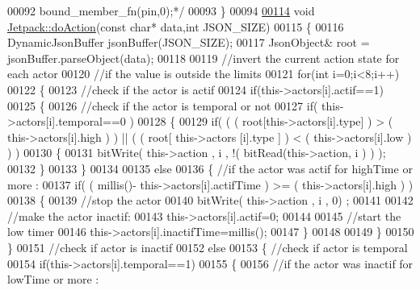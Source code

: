 \begin{DoxyCode}
00092 \textcolor{comment}{    bound\_member\_fn(pin,0);*/}
00093 \}
00094 
\hyperlink{class_jetpack_a86d2e83436ef4b85f4c3a6e85ac785b0}{00114} \textcolor{keywordtype}{void} \hyperlink{class_jetpack_a86d2e83436ef4b85f4c3a6e85ac785b0}{Jetpack::doAction}(\textcolor{keyword}{const} \textcolor{keywordtype}{char}* data,\textcolor{keywordtype}{int} JSON\_SIZE)
00115 \{
00116     DynamicJsonBuffer jsonBuffer(JSON\_SIZE);
00117     JsonObject& root = jsonBuffer.parseObject(data);
00118     
00119     \textcolor{comment}{//invert the current action state for each actor}
00120     \textcolor{comment}{//if the value is outside the limits}
00121     \textcolor{keywordflow}{for}(\textcolor{keywordtype}{int} i=0;i<8;i++)
00122     \{
00123         \textcolor{comment}{//check if the actor is actif }
00124         \textcolor{keywordflow}{if}(this->actors[i].actif==1)
00125         \{   
00126             \textcolor{comment}{//check if the actor is temporal or not}
00127             \textcolor{keywordflow}{if}( this->actors[i].temporal==0 ) 
00128             \{
00129                 \textcolor{keywordflow}{if}( ( ( root[this->actors[i].type] ) > ( this->actors[i].high ) ) || ( ( root[ this->actors
      [i].type ] ) < ( this->actors[i].low ) ) )   
00130                 \{   
00131                     bitWrite( this->action , i , !( bitRead(this->action, i ) ) );  
00132                 \}
00133             \}
00134 
00135             \textcolor{keywordflow}{else}
00136             \{   \textcolor{comment}{//if the actor was actif for highTime or more :}
00137                 \textcolor{keywordflow}{if}( ( millis()- this->actors[i].actifTime  ) >= ( this->actors[i].high  ) )
00138                 \{
00139                     \textcolor{comment}{//stop the actor}
00140                     bitWrite( this->action , i , 0) ;
00141 
00142                     \textcolor{comment}{//make the actor inactif:}
00143                     this->actors[i].actif=0;
00144 
00145                     \textcolor{comment}{//start the low timer}
00146                     this->actors[i].inactifTime=millis();               
00147                 \}           
00148                             
00149             \}
00150         \}
00151         \textcolor{comment}{//check if actor is inactif}
00152         \textcolor{keywordflow}{else}
00153         \{   \textcolor{comment}{//check if actor is temporal}
00154             \textcolor{keywordflow}{if}(this->actors[i].temporal==1)
00155             \{
00156                 \textcolor{comment}{//if the actor was inactif for lowTime or more :}

\end{DoxyCode}
